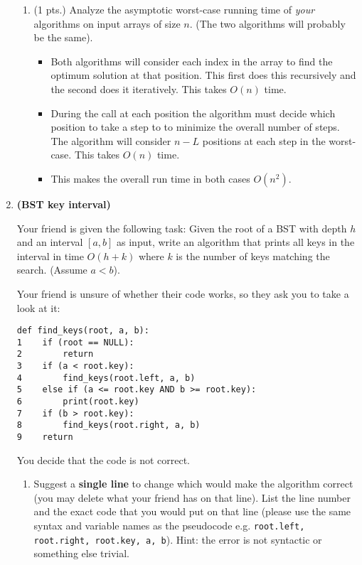 \documentclass[letterpaper,11pt]{article}
\begin{document}
\begin{enumerate}
\begin{enumerate}
\item (1 pts.) Analyze the asymptotic worst-case running time of \emph{your} algorithms on input
  arrays of size $n$. (The two algorithms will probably be the same).
  \begin{itemize}
      \color{teal}
      \item Both algorithms will consider each index in the array to find 
          the optimum solution at that position. This first does this 
          recursively and the second does it iteratively. This takes 
          $O\left( n \right) $ time.
      \item During the call at each position the algorithm must decide which
          position to take a step to to minimize the overall number of steps. 
          The algorithm will consider $n - L$ positions at each step in the 
          worst-case. This takes $O\left( n \right) $ time.
      \item This makes the overall run time in both cases 
          $O\left( n^{2} \right) $.
  \end{itemize}
 
\end{enumerate}
\newpage

\item \textbf{(BST key interval)}

Your friend is given the following task: Given the root of a BST with depth $h$ and an interval $[a,b]$ as input, write an algorithm that prints all keys in the interval in time $O(h+k)$ where $k$ is the number of keys matching the search. (Assume $a<b$).

Your friend is unsure of whether their code works, so they ask you to take a look at it:

\begin{verbatim}
def find_keys(root, a, b):
1    if (root == NULL):
2        return
3    if (a < root.key):  
4        find_keys(root.left, a, b)
5    else if (a <= root.key AND b >= root.key):  
6        print(root.key)
7    if (b > root.key):  
8        find_keys(root.right, a, b) 
9    return
\end{verbatim}


You decide that the code is not correct.
\begin{enumerate}
    \item Suggest a \textbf{single line} to change which would make the algorithm correct (you may delete what your friend has on that line). List the line number and the exact code that you would put on that line (please use the same syntax and variable names as the pseudocode e.g. \texttt{root.left, root.right, root.key, a, b}). Hint: the error is not syntactic or something else trivial.


\end{enumerate}
\end{enumerate}
\end{document}
